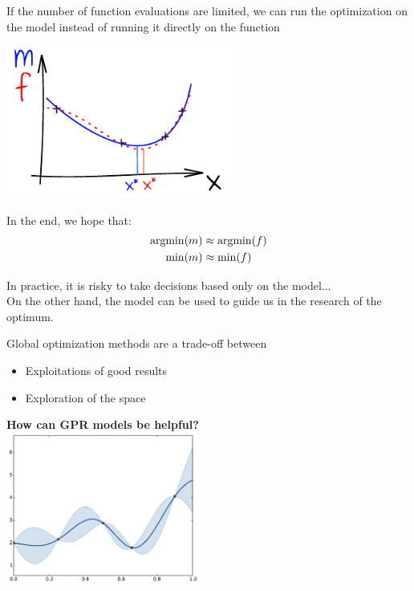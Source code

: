 \documentclass{beamer}
\newcommand{\argmin}{\operatornamewithlimits{argmin}}
\begin{document}
\begin{frame}{}
If the number of function evaluations are limited, we can run the optimization on the model instead of running it directly on the function
\begin{center}
\includegraphics[height=5cm]{figures/ink_mf}
\end{center}
In the end, we hope that:
\begin{equation}
	\begin{split}
		\argmin(m) & \approx \argmin(f)\\
		\min(m) & \approx \min(f)\\
	\end{split}
\end{equation}
\end{frame}

\begin{frame}{}
In practice, it is risky to take decisions based only on the model...\\
\vspace{3mm} 
On the other hand, the model can be used to guide us in the research of the optimum. 

\end{frame}

\begin{frame}{}
Global optimization methods are a trade-off between 
\begin{itemize}
	\item Exploitations of good results
	\item Exploration of the space
\end{itemize}
\vspace{3mm}
\begin{center}
\textbf{How can GPR models be helpful?}\\
\includegraphics[height=5cm]{figures/python/ego_0}
\end{center}
\end{frame}
\end{document}
